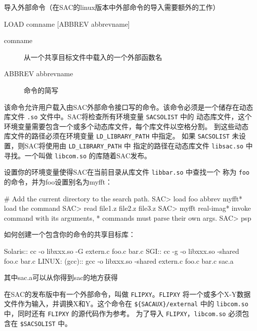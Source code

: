 \label{cmd:load}

导入外部命令（在SAC的linux版本中外部命令的导入需要额外的工作）

\begin{SACSTX}
LOAD comname [ABBREV abbrevname]
\end{SACSTX}

\begin{description}
\item [comname] 从一个共享目标文件中载入的一个外部函数名
\item [ABBREV abbrevname] 命令的简写
\end{description}

该命令允许用户载入由SAC外部命令接口写的命令。该命令必须是一个储存在动态
库文件 \texttt{.so} 文件中。SAC将检查所有环境变量 \texttt{SACSOLIST} 中的
动态库文件，这个环境变量需要包含一个或多个动态库文件，每个库文件以空格分割。
到这些动态库文件的路径必须在环境变量 \verb|LD_LIBRARY_PATH| 中指定。
如果 \texttt{SACSOLIST} 未设置，则SAC将使用由 \verb|LD_LIBRARY_PATH| 中
指定的路径在动态库文件 \texttt{libsac.so} 中寻找。一个叫做 \texttt{libcom.so}
的库随着SAC发布。

设置你的环境变量使得SAC在当前目录从库文件 \texttt{libbar.so} 中查找一个
称为 \texttt{foo} 的命令，并为foo设置别名为myfft：
\begin{SACCode}
#  Add the current directory to the search path.
SAC> load foo abbrev myfft* load the command
SAC> read file1.z file2.z file3.z
SAC> myfft real-imag* invoke command with its arguments,
* commands must parse their own args.
SAC> psp
\end{SACCode}

如何创建一个包含你的命令的共享目标库：
\begin{SACCode}
Solaris::
cc -o libxxx.so -G extern.c foo.c bar.c
SGI::
cc -g -o libxxx.so -shared foo.c bar.c
LINUX: (gcc)::
gcc -o libxxx.so -shared extern.c foo.c bar.c sac.a
\end{SACCode}
其中sac.a可以从你得到sac的地方获得

在SAC的发布版中有一个外部命令，叫做 \texttt{FLIPXY}。\texttt{FLIPXY}
将一个或多个X-Y数据文件作为输入，并调换X和Y。这个命令在 \verb|${SACAUX}/external|
中的 \texttt{libcom.so} 中，同时还有 \texttt{FLIPXY} 的源代码作为参考。
为了导入 \texttt{FLIPXY}，\texttt{libcom.so} 必须包含在 \verb|$SACSOLIST| 中。
